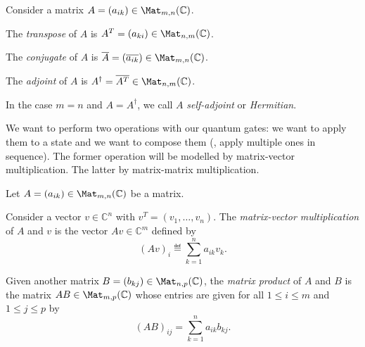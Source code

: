 \documentclass[a4paper,oneside, 12pt]{amsart}
\begin{document}
\begin{definition}\label{def:adjoint}
  Consider a matrix \( A = (a_{ik}) \in \Mat_{m,n}(\mathbb{C}) \).
  \begin{thmlist}
    \item The \emph{transpose} of \( A \) is \( A^T = (a_{ki}) \in \Mat_{n,m}(\mathbb{C}) \).
    \item The \emph{conjugate} of \( A \) is \( \overline{A} = (\overline{a_{ik}}) \in \Mat_{m,n}(\mathbb{C}) \).
    \item The \emph{adjoint} of \( A \) is \( A^\dagger = \overline{A^T} \in \Mat_{n,m}(\mathbb{C}) \).
  \end{thmlist}
  In the case \( m = n \) and \( A = A^\dagger \), we call \( A \) \emph{self-adjoint} or \emph{Hermitian}.
\end{definition}


We want to perform two operations with our quantum gates:
we want to apply them to a state and we want to compose them (\ie, apply multiple ones in sequence).
The former operation will be modelled by matrix-vector multiplication.
The latter by matrix-matrix multiplication.

\begin{definition}\label{def:matrix-multiplication}
  Let \( A = (a_{ik}) \in \Mat_{m,n}(\mathbb{C}) \) be a matrix.
  \begin{thmlist}
    \item Consider a vector \(v\in \mathbb{C}^{n}\) with \(v^{T}= (v_{1}, \dots , v_{n})\).
    The \emph{matrix-vector multiplication} of \(A\) and \(v\) is the vector \(Av \in \mathbb{C}^{m}\) defined by
    \begin{equation}
      (Av)_{i} \eqdef \sum_{k=1}^{n} a_{ik} v_{k}.
    \end{equation}
    \item Given another matrix \( B = (b_{kj}) \in \Mat_{n,p}(\mathbb{C}) \), the \emph{matrix product} of \(A\) and \(B\) is the matrix \( AB \in \Mat_{m,p}(\mathbb{C}) \) whose entries are given for all \(1\leq i \leq m\) and \(1\leq j \leq p\) by
    \begin{equation*}
      (AB)_{ij} = \sum_{k=1}^n a_{ik} b_{kj}.
    \end{equation*}
  \end{thmlist}
\end{definition}
\end{document}
